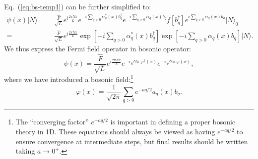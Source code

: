 Eq.~(\ref{eq:bs-temp1}) can be further simplified to:
\begin{equation*}
\begin{aligned}
	\psi(x)|N\rangle 
	=&\ \frac{\hat{F}}{\sqrt{L}} e^{i \frac{2 \pi \hat{N} x}{L}} e^{-i\sum_{q>0} \alpha^*_{q}(x) b_{q}^{\dagger}} e^{-i\sum_{q>0} \alpha_{q}(x) b_{q}} f\left[b_{q}^{\dagger}\right] e^{i\sum_{q>0} \alpha_{q}(x) b_{q}} |N\rangle_{0} \\
	=&\ \frac{\hat{F}}{\sqrt{L}} e^{i \frac{2 \pi \hat{N} x}{L}} \exp \left[-i\sum_{q>0} \alpha^*_{q}(x) b_{q}^{\dagger}\right] \exp \left[-i\sum_{q>0} \alpha_{q}(x) b_{q}\right]|N\rangle.
\end{aligned}
\end{equation*}
We thus express the Fermi field operator in bosonic operator:
\begin{equation}\label{eq:bs-fermi-field-1}
	\psi(x) = \frac{\hat{F}}{\sqrt{L}} e^{i \frac{2 \pi \hat{N} x}{L}} e^{-i\sqrt{2\pi}\varphi^\dagger(x)} e^{-i\sqrt{2\pi}\varphi(x)},
\end{equation}
where we have introduced a bosonic field:\footnote{The ``converging factor'' $e^{-a q / 2}$ is important in defining a proper bosonic theory in 1D. These equations should always be viewed as having $e^{-a q / 2}$ to ensure convergence at intermediate steps, but final results should be written taking $a \rightarrow 0^{+}$.}
\begin{equation}
	\varphi(x) = \frac{1}{\sqrt{2\pi}}\sum_{q>0} e^{-a q/2} a_{q}(x) b_{q}.
\end{equation}

